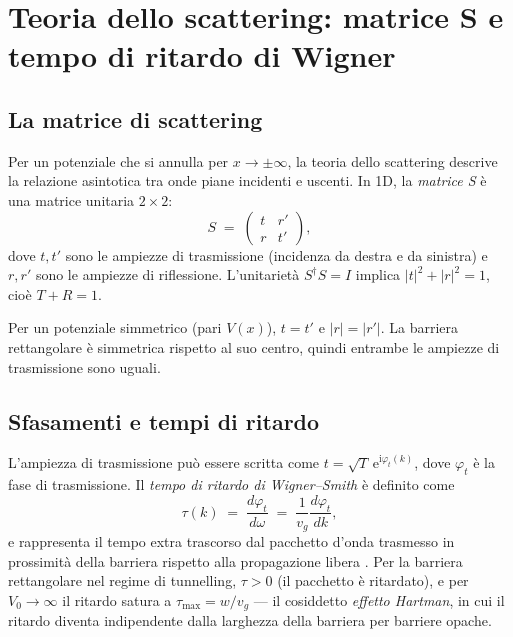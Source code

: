 \documentclass[12pt, a4paper]{article}
\newcommand{\ii}{\mathrm{i}}          %
\newcommand{\ee}{\mathrm{e}}          %
\begin{document}
\section{Teoria dello scattering: matrice S e tempo di ritardo di Wigner}
\label{app:scattering}

\subsection{La matrice di scattering}

Per un potenziale che si annulla per $x \to \pm\infty$, la teoria
dello scattering descrive la relazione asintotica tra onde piane
incidenti e uscenti.  In 1D, la \emph{matrice S} è una matrice
unitaria $2\times 2$:
\begin{equation}
  S \;=\;
  \begin{pmatrix}
    t   & r' \\
    r   & t'
  \end{pmatrix},
\end{equation}
dove $t, t'$ sono le ampiezze di trasmissione (incidenza da destra e
da sinistra) e $r, r'$ sono le ampiezze di riflessione.  L'unitarietà
$S^\dagger S = I$ implica $|t|^2 + |r|^2 = 1$, cioè $T + R = 1$.

Per un potenziale simmetrico (pari $V(x)$), $t = t'$ e $|r| = |r'|$.
La barriera rettangolare è simmetrica rispetto al suo centro, quindi
entrambe le ampiezze di trasmissione sono uguali.

\subsection{Sfasamenti e tempi di ritardo}

L'ampiezza di trasmissione può essere scritta come
$t = \sqrt{T}\,\ee^{\ii\varphi_t(k)}$, dove $\varphi_t$ è la fase
di trasmissione.  Il \emph{tempo di ritardo di Wigner--Smith} è
definito come
\begin{equation}
  \tau(k) \;=\; \frac{d\varphi_t}{d\omega}
  \;=\; \frac{1}{v_g}\frac{d\varphi_t}{dk},
  \label{eq:wigner}
\end{equation}
e rappresenta il tempo extra trascorso dal pacchetto d'onda trasmesso
in prossimità della barriera rispetto alla propagazione libera
\cite{Wigner1955}.  Per la barriera rettangolare nel regime di
tunnelling, $\tau > 0$ (il pacchetto è ritardato), e per
$V_0 \to \infty$ il ritardo satura a
$\tau_\text{max} = w/v_g$ --- il cosiddetto \emph{effetto Hartman},
in cui il ritardo diventa indipendente dalla larghezza della barriera
per barriere opache.
\end{document}
